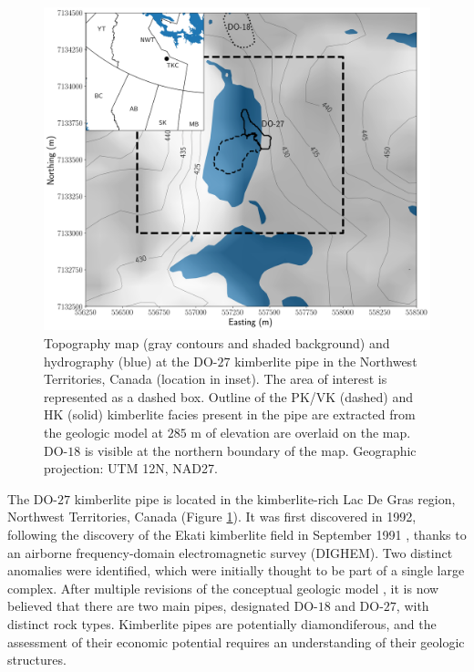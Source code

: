 \documentclass[paper, twocolumn]{geophysics} %
\begin{document}

\begin{figure}
\centering
\includegraphics[width=\columnwidth]{Figures/300dpi/Figure1.png}
\caption{Topography map (gray contours and shaded background) and hydrography (blue) at the DO-$27$ kimberlite pipe in the Northwest Territories, Canada (location in inset). The area of interest is represented as a dashed box. Outline of the PK/VK (dashed) and HK (solid) kimberlite facies present in the pipe are extracted from the geologic model at $285$ m of elevation are overlaid on the map. DO-$18$ is visible at the northern boundary of the map. Geographic projection: UTM 12N, NAD27.}
\label{fig:Figure1.png}
\end{figure}

The DO-$27$ kimberlite pipe is located in the kimberlite-rich Lac De Gras region, Northwest Territories, Canada (Figure \ref{fig:Figure1.png}). It was first discovered in 1992, following the discovery of the Ekati kimberlite field in September 1991 \citep{DiamondsInCanada}, thanks to an airborne frequency-domain electromagnetic survey (DIGHEM). Two distinct anomalies were identified, which were initially thought to be part of a single large complex. After multiple revisions of the conceptual geologic model \citep{HARDER2009}, it is now believed that there are two main pipes, designated DO-$18$ and DO-$27$, with distinct rock types. Kimberlite pipes are potentially diamondiferous, and the assessment of their economic potential requires an understanding of their geologic structures.
\end{document}
